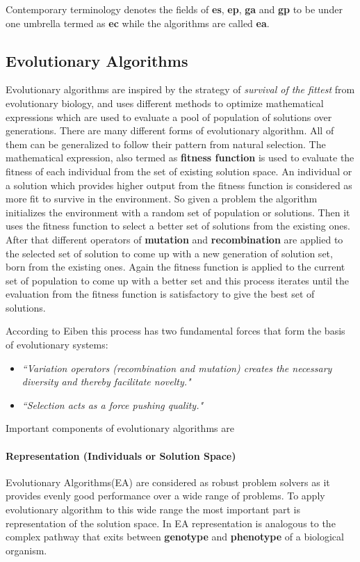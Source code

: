 Contemporary terminology denotes the fields of \textbf{\gls{es}}, \textbf{\gls{ep}}, \textbf{\gls{ga}} and \textbf{\gls{gp}} to be under one umbrella termed as \textbf{\gls{ec}} while the algorithms are called \textbf{\gls{ea}}.

\subsection{Evolutionary Algorithms}
Evolutionary algorithms are inspired by the strategy of \textit{survival of the fittest} from evolutionary biology, and uses different methods to optimize mathematical expressions which are used to evaluate a pool of population of solutions over generations. There are many different forms of evolutionary algorithm. All of them can be generalized to follow their pattern from natural selection. The mathematical expression, also termed as \textbf{fitness function} is used to evaluate the fitness of each individual from the set of existing solution space. An individual or a solution which provides higher output from the fitness function is considered as more fit to survive in the environment. So given a problem the algorithm initializes the environment with a random set of population or solutions. Then it uses the fitness function to select a better set of solutions from the existing ones. After that different operators of \textbf{mutation} and \textbf{recombination} are applied to the selected set of solution to come up with a new generation of solution set, born from the existing ones. Again the fitness function is applied to the current set of population to come up with a better set and this process iterates until the evaluation from the fitness function is satisfactory to give the best set of solutions.

According to Eiben \cite{eiben2003} this process has two fundamental forces that form the basis of evolutionary systems:

\begin{itemize}
	\item \textsl{``Variation operators (recombination and mutation) creates the necessary diversity and thereby facilitate novelty."}
	\item \textsl{``Selection acts as a force pushing quality."}
\end{itemize}

Important components of evolutionary algorithms are

\paragraph{Representation (Individuals or Solution Space)}
Evolutionary Algorithms(EA) are considered as robust problem solvers as it provides evenly good performance over a wide range of problems. To apply evolutionary algorithm to this wide range the most important part is representation of the solution space. In EA representation is analogous to the complex pathway that exits between \textbf{genotype} and \textbf{phenotype} of a biological organism.

